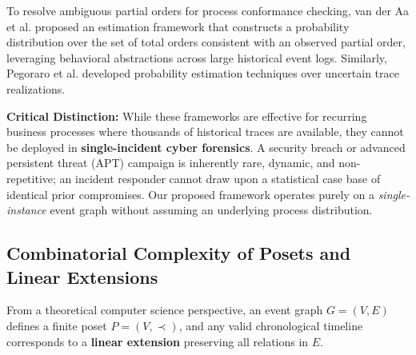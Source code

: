 \documentclass[journal]{IEEEtran}
\begin{document}
To resolve ambiguous partial orders for process conformance checking, van der Aa et al. \cite{vanderAa2020} proposed an estimation framework that constructs a probability distribution over the set of total orders consistent with an observed partial order, leveraging behavioral abstractions across large historical event logs. Similarly, Pegoraro et al. \cite{Pegoraro2021} developed probability estimation techniques over uncertain trace realizations. 

\textbf{Critical Distinction:} While these frameworks are effective for recurring business processes where thousands of historical traces are available, they cannot be deployed in \textbf{single-incident cyber forensics}. A security breach or advanced persistent threat (APT) campaign is inherently rare, dynamic, and non-repetitive; an incident responder cannot draw upon a statistical case base of identical prior compromises. Our proposed framework operates purely on a \emph{single-instance} event graph without assuming an underlying process distribution.

\subsection{Combinatorial Complexity of Posets and Linear Extensions}
From a theoretical computer science perspective, an event graph $G = (V, E)$ defines a finite poset $P = (V, \prec)$, and any valid chronological timeline corresponds to a \textbf{linear extension} preserving all relations in $E$.
\end{document}
